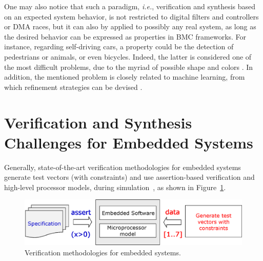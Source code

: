 \documentclass{acm_sen_article}
\begin{document}
One may also notice that such a paradigm, {\it i.e.}, verification and synthesis based on an expected system behavior, is not restricted to digital filters and controllers or DMA races, but it can also by applied to possibly any real system, as long as the desired behavior can be expressed as properties in BMC frameworks. For instance, regarding self-driving cars, a property could be the detection of pedestrians or animals, or even bicycles. Indeed, the latter is considered one of the most difficult problems, due to the myriad of possible shape and colors \cite{selfcar}. In addition, the mentioned problem is closely related to machine learning, from which refinement strategies can be devised \cite{BMCml}. 


\section{Verification and Synthesis \\ Challenges for Embedded Systems}
\label{Verification-Challenges} 

Generally, state-of-the-art verification methodologies for embedded systems generate test vectors (with constraints) and use assertion-based verification and high-level processor models, during simulation~\cite{Behrend15,Lettnin09}, as shown in Figure~\ref{verification-methodologies}. 
%
\begin{figure}[h]
	\centering
	\includegraphics[scale=0.35]{figure3.eps}
	\caption{Verification methodologies for embedded systems.}
	\label{verification-methodologies}
\end{figure}
\end{document}
